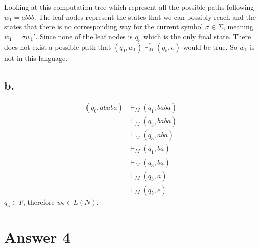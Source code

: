 \documentclass[12pt]{article}
\begin{document}
Looking at this computation tree which represent all the possible paths following $w_1=abbb$. The leaf nodes represent the states that we can possibly reach and the states that there is no corresponding way for the current symbol $\sigma \in \Sigma$, meaning $w_1=\sigma w_1'$. Since none of the leaf nodes is $q_5$ which is the only final state. There does not exist a possible path that $(q_0,w_1)\vdash _M^* (q_5,e)$ would be true. So $w_1$ is not in this language.
\subsection*{b.}

\begin{equation} 
\begin{split}
(q_0,ababa)  & \vdash_M (q_1,baba) \\
& \vdash_M (q_3,baba) \\
& \vdash_M (q_3,aba) \\
& \vdash_M (q_1,ba) \\
& \vdash_M (q_3,ba) \\
& \vdash_M (q_3,a) \\
& \vdash_M (q_5,e) 
\end{split}
\end{equation} 
$q_5\in F$, therefore $w_2\in L(N)$.


\section*{Answer 4}
\end{document}
